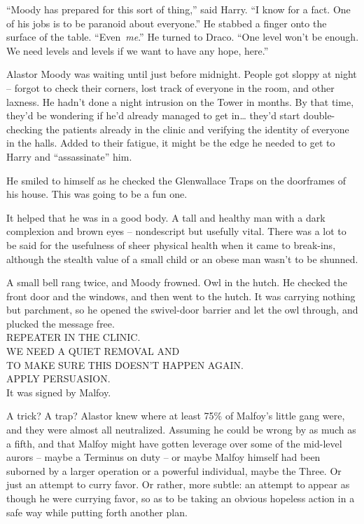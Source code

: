 ``Moody has prepared for this sort of thing,'' said Harry. ``I know for
a fact. One of his jobs is to be paranoid about everyone.'' He stabbed a
finger onto the surface of the table. ``Even~\emph{me}.'' He turned to
Draco. ``One level won't be enough. We need levels and levels if we want
to have any hope, here.''

\mybreak

Alastor Moody was waiting until just before midnight. People got sloppy
at night -- forgot to check their corners, lost track of everyone in the
room, and other laxness. He hadn't done a night intrusion on the Tower
in months. By that time, they'd be wondering if he'd already managed to
get in\ldots{} they'd start double-checking the patients already in the
clinic and verifying the identity of everyone in the halls. Added to
their fatigue, it might be the edge he needed to get to Harry and
``assassinate'' him.

He smiled to himself as he checked the Glenwallace Traps on the
doorframes of his house. This was going to be a fun one.

It helped that he was in a good body. A tall and healthy man with a dark
complexion and brown eyes -- nondescript but usefully vital. There was a
lot to be said for the usefulness of sheer physical health when it came
to break-ins, although the stealth value of a small child or an obese
man wasn't to be shunned.

A small bell rang twice, and Moody frowned. Owl in the hutch. He checked
the front door and the windows, and then went to the hutch. It was
carrying nothing but parchment, so he opened the swivel-door barrier and
let the owl through, and plucked the message free.\\

\noindent REPEATER IN THE CLINIC.\\
WE NEED A QUIET REMOVAL AND\\
TO MAKE SURE THIS DOESN'T HAPPEN AGAIN.\\
APPLY PERSUASION.\\

It was signed by Malfoy.

A trick? A trap? Alastor knew where at least 75\% of Malfoy's little
gang were, and they were almost all neutralized. Assuming he could be
wrong by as much as a fifth, and that Malfoy might have gotten leverage
over some of the mid-level aurors -- maybe a Terminus on duty -- or
maybe Malfoy himself had been suborned by a larger operation or a
powerful individual, maybe the Three. Or just an attempt to curry favor.
Or rather, more subtle: an attempt to appear as though he were currying
favor, so as to be taking an obvious hopeless action in a safe way while
putting forth another plan.

